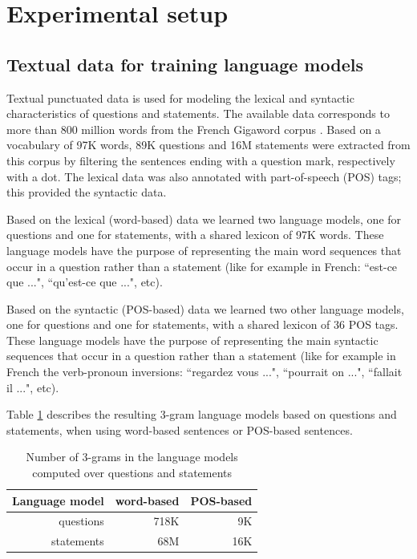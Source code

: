 \documentclass[runningheads,a4paper]{llncs}
\begin{document}
\section{Experimental setup}


\subsection{Textual data for training language models}

Textual punctuated data is used for modeling the lexical and syntactic characteristics of questions and statements.
The available data corresponds to more than 800 million words from the French Gigaword corpus \cite{Mendonca:2011}.
Based on a vocabulary of 97K words, 89K questions and 16M statements were extracted from this corpus by filtering the sentences ending with a question mark, respectively with a dot.
The lexical data was also annotated with part-of-speech (POS) tags; this provided the syntactic data.

Based on the lexical (word-based) data we learned two language models, one for questions and one for statements, with a shared lexicon of 97K words. These language models have the purpose of representing the main word sequences that occur in a question rather than a statement (like for example in French: ``est-ce que ...", ``qu'est-ce que ...", etc).

Based on the syntactic (POS-based) data we learned two other language models, one for questions and one for statements, with a shared lexicon of 36 POS tags. These language models have the purpose of representing the main syntactic sequences that occur in a question rather than a statement (like for example in French the verb-pronoun inversions: ``regardez vous ...", ``pourrait on ...", ``fallait il ...", etc).

Table \ref{Tab:LMs} describes the resulting 3-gram language models based on questions and statements, when using word-based sentences or POS-based sentences.

\begin{table}
\caption{Number of 3-grams in the language models computed over questions and statements}
\label{Tab:LMs}
\centering
\begin{tabular}{|r|r|r|}
\hline
{\bf Language model}  & word-based  & POS-based 	\\ \hline
questions     & 718K  &  9K  	\\ \hline
statements    &  68M  & 16K   	\\ \hline
\end{tabular}
\end{table}
\end{document}
